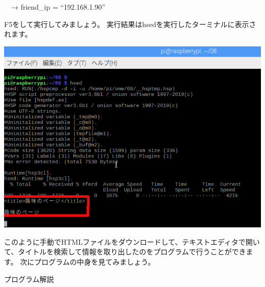 \documentclass[a4paper,12pt,dvipdfmx]{jarticle}
\begin{document}
\ \ → friend\_ip = “192.168.1.90”

F5をして実行してみましょう。
実行結果はhsedを実行したターミナルに表示されます。



\begin{center}
\includegraphics[width=15.411cm]{textbook-img015.png}

\end{center}


\bigskip


\bigskip

このように手動でHTMLファイルをダウンロードして、テキストエディタで開いて、タイトルを検索して情報を取り出したのをプログラムで行うことができます。
次にプログラムの中身を見てみましょう。

\clearpage
プログラム解説
\end{document}
